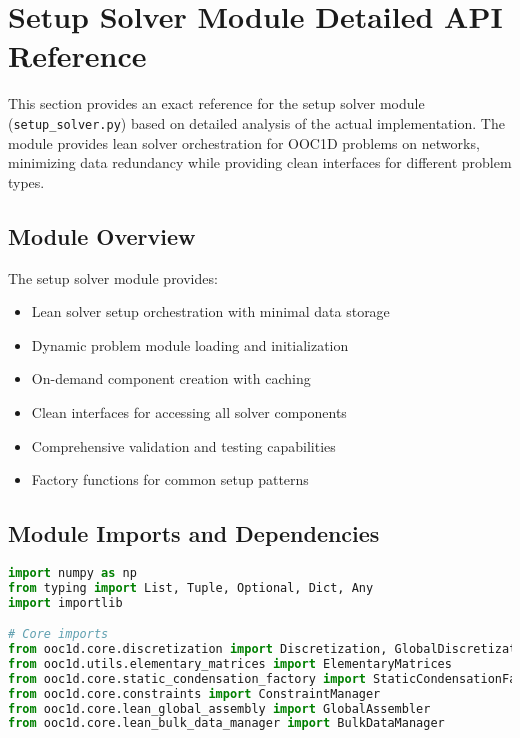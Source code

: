 %

\section{Setup Solver Module Detailed API Reference}
\label{sec:setup_solver_detailed_api}

This section provides an exact reference for the setup solver module (\texttt{setup\_solver.py}) based on detailed analysis of the actual implementation. The module provides lean solver orchestration for OOC1D problems on networks, minimizing data redundancy while providing clean interfaces for different problem types.

\subsection{Module Overview}

The setup solver module provides:
\begin{itemize}
    \item Lean solver setup orchestration with minimal data storage
    \item Dynamic problem module loading and initialization
    \item On-demand component creation with caching
    \item Clean interfaces for accessing all solver components
    \item Comprehensive validation and testing capabilities
    \item Factory functions for common setup patterns
\end{itemize}

\subsection{Module Imports and Dependencies}

\begin{lstlisting}[language=Python, caption=Module Dependencies]
import numpy as np
from typing import List, Tuple, Optional, Dict, Any
import importlib

# Core imports
from ooc1d.core.discretization import Discretization, GlobalDiscretization
from ooc1d.utils.elementary_matrices import ElementaryMatrices
from ooc1d.core.static_condensation_factory import StaticCondensationFactory
from ooc1d.core.constraints import ConstraintManager
from ooc1d.core.lean_global_assembly import GlobalAssembler
from ooc1d.core.lean_bulk_data_manager import BulkDataManager
\end{lstlisting}

